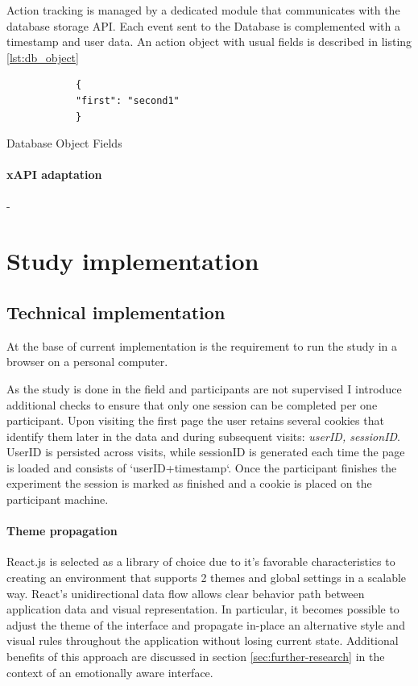 		
		Action tracking is managed by a dedicated module that communicates with the database storage API. Each event sent to the Database is complemented with a timestamp and user data. An action object with usual fields is described in listing \ref{lst:db_object}


	\begin{listing}[h]
		\begin{verbatim}
			{
			"first": "second1"
			}
		\end{verbatim}
		\caption{Database Object Fields}
		\label{lst:db_object}
	\end{listing}


		
		\paragraph{xAPI adaptation} - 
		

\section{Study implementation}



\subsection{Technical implementation} \label{sec:study_technical_implementation}
At the base of current implementation is the requirement to run the study in a browser on a personal computer. 

As the study is done in the field and participants are not supervised I introduce additional checks to ensure that only one session can be completed per one participant. Upon visiting the first page the user retains several cookies that identify them later in the data and during subsequent visits: \textit{userID, sessionID}. UserID is persisted across visits, while sessionID is generated each time the page is loaded and consists of `userID+timestamp`. Once the participant finishes the experiment the session is marked as finished and a cookie is placed on the participant machine.

\paragraph{Theme propagation} React.js is selected as a library of choice due to it's favorable characteristics to creating an environment that supports 2 themes and global settings in a scalable way. React's unidirectional data flow allows clear behavior path between application data and visual representation. In particular, it becomes possible to adjust the theme of the interface and propagate in-place an alternative style and visual rules throughout the application without losing current state. Additional benefits of this approach are discussed in section \ref{sec:further-research} in the context of an emotionally aware interface.

